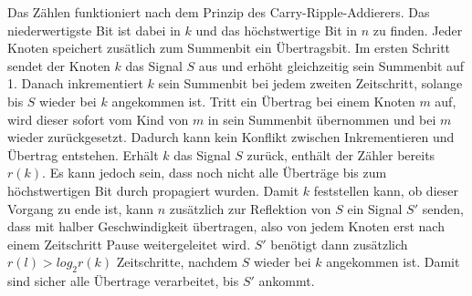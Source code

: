 \documentclass[11pt]{article}
\begin{document}
Das Zählen funktioniert nach dem Prinzip des Carry-Ripple-Addierers. 
Das niederwertigste Bit ist dabei in $k$ und das höchstwertige Bit in $n$ zu finden.
Jeder Knoten speichert zusätlich zum Summenbit ein Übertragsbit. Im ersten Schritt sendet der Knoten $k$ das Signal $S$ aus und erhöht gleichzeitig sein Summenbit auf 1. Danach inkrementiert $k$ sein Summenbit bei jedem zweiten Zeitschritt, solange bis $S$ wieder bei $k$ angekommen ist. 
Tritt ein Übertrag bei einem Knoten $m$ auf, wird dieser sofort vom Kind von $m$ in sein Summenbit übernommen und bei $m$ wieder zurückgesetzt.
Dadurch kann kein Konflikt zwischen Inkrementieren und Übertrag entstehen.
Erhält $k$ das Signal $S$ zurück, enthält der Zähler bereits $r(k)$. 
Es kann jedoch sein, dass noch nicht alle Überträge bis zum höchstwertigen Bit durch propagiert wurden. 
Damit $k$ feststellen kann, ob dieser Vorgang zu ende ist, kann $n$ zusätzlich zur Reflektion von $S$ ein Signal $S'$ senden, dass mit halber Geschwindigkeit übertragen, also von jedem Knoten erst nach einem Zeitschritt Pause weitergeleitet wird.
$S'$ benötigt dann zusätzlich $r(l) > log_2 r(k)$ Zeitschritte, nachdem $S$ wieder bei $k$ angekommen ist. 
Damit sind sicher alle Übertrage verarbeitet, bis $S'$ ankommt.
\end{document}
